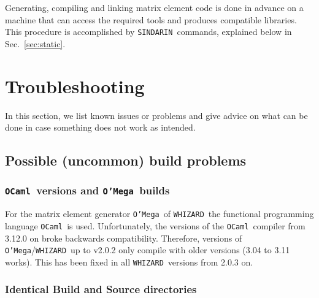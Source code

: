 \documentclass[12pt]{book}
\newcommand{\ttt}[1]{\texttt{#1}}
\newcommand{\whizard}{\ttt{WHIZARD}}
\newcommand{\oMega}{\ttt{O'Mega}}
\newcommand{\sindarin}{\ttt{SINDARIN}}
\newcommand{\ocaml}{\ttt{OCaml}}
\begin{document}
Generating, compiling and linking matrix element code is done in advance on a
machine that can access the required tools and produces compatible libraries.
This procedure is accomplished by \sindarin\ commands, explained below in
Sec.~\ref{sec:static}.

\newpage

\section{Troubleshooting}
\label{sec:troubleshooting}

In this section, we list known issues or problems and give advice on
what can be done in case something does not work as intended.

\subsection{Possible (uncommon) build problems}
\label{sec:buildproblems}

\subsubsection{\ocaml\ versions and \oMega\ builds}

For the matrix element generator \oMega\ of \whizard\, the functional
programming language \ocaml\ is used. Unfortunately, the versions of
the \ocaml\ compiler from 3.12.0 on broke backwards
compatibility. Therefore,  versions of \oMega/\whizard\ up to v2.0.2
only compile with older versions (3.04 to 3.11 works). This has been
fixed in all \whizard\ versions from 2.0.3 on.

\subsubsection{Identical Build and Source directories}
\end{document}
